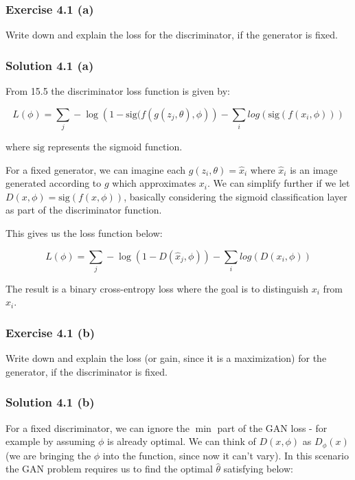 \documentclass[
10pt, %
a4paper, %
oneside, %
headinclude,footinclude, %
BCOR5mm, %
]{scrartcl}
\begin{document}
\subsubsection*{Exercise 4.1 (a)}
Write down and explain the loss for the discriminator, if the generator is fixed.

\subsubsection*{Solution 4.1 (a)}

From \citet{prince2023understanding} 15.5 the discriminator loss function is given by:

\begin{equation*}
  L(\phi) = \sum_j - \log\left(1 - \textrm{sig}(f(g(z_j, \theta), \phi)\right) - \sum_i log\left(\textrm{sig}(f(x_i, \phi))\right)
\end{equation*}

where $\textrm{sig}$ represents the sigmoid function.

For a fixed generator, we can imagine each $g(z_i, \theta) = \hat{x}_i$ where $\hat{x}_i$ is an image generated according to $g$ which approximates $x_i$. We can simplify further if we let $D(x, \phi) = \textrm{sig}(f(x, \phi))$, basically considering the sigmoid classification layer as part of the discriminator function.

This gives us the loss function below:

\begin{equation*}
  L(\phi) = \sum_j - \log(1 - D(\hat{x}_j, \phi)) - \sum_i log(D(x_i, \phi))
\end{equation*}

The result is a binary cross-entropy loss where the goal is to distinguish $x_i$ from $\hat{x}_i$.

\subsubsection*{Exercise 4.1 (b)}
Write down and explain the loss (or gain, since it is a maximization) for the generator, if the discriminator is fixed.

\subsubsection*{Solution 4.1 (b)}



For a fixed discriminator, we can ignore the $\min$ part of the GAN loss - for example by assuming $\phi$ is already optimal. We can think of $D(x, \phi)$ as $D_\phi(x)$ (we are bringing the $\phi$ into the function, since now it can't vary). In this scenario the GAN problem requires us to find the optimal $\hat{\theta}$ satisfying below:
\end{document}
